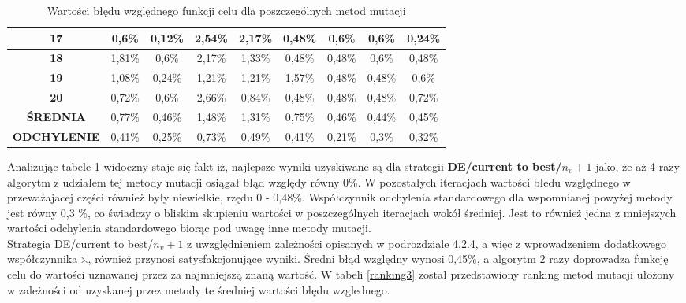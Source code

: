 \begin{table}[h!]
\begin{center}
{\begin{tabular}{|c|c|c|c|c|c|c|c|c|}
 \textbf{17}&0,6\%&0,12\%&2,54\%&2,17\%&0,48\%&0,6\%&0,6\%&0,24\%\\
\hline
 \textbf{18}&1,81\%&0,6\%&2,17\%&1,33\%&0,48\%&0,48\%&0,6\%&0,48\%\\
\hline
 \textbf{19}&1,08\%&0,24\%&1,21\%&1,21\%&1,57\%&0,48\%&0,48\%&0,6\%\\
\hline
 \textbf{20}&0,72\%&0,6\%&2,66\%&0,84\%&0,48\%&0,48\%&0,48\%&0,72\%\\
\hline
 \textbf{ŚREDNIA}&0,77\%&0,46\%&1,48\%&1,31\%&0,75\%&0,46\%&0,44\%&0,45\%\\
\hline
 \textbf{ODCHYLENIE}&0,41\%&0,25\%&0,73\%&0,49\%&0,41\%&0,21\%&0,3\%&0,32\%\\
\hline
\end{tabular}}
\caption{Wartości błędu względnego funkcji celu dla poszczególnych metod mutacji}
\label{losowa20}
\end{center}
\end{table}
\par
Analizując tabele \ref{losowa20} widoczny staje się fakt iż, najlepsze wyniki uzyskiwane są dla strategii \textbf{DE/current to best/\textbf{$n_{v}+1$}} jako, że aż 4 razy algorytm z udziałem tej metody mutacji osiągał błąd względy równy 0\%. W pozostałych iteracjach wartości błedu względnego w przeważajacej części również były niewielkie, rzędu 0 - 0,48\%.  Współczynnik  odchylenia standardowego dla wspomnianej powyżej metody jest równy 0,3 \%, co świadczy o bliskim skupieniu wartości w poszczególnych iteracjach wokół średniej. Jest to również jedna z mniejszych wartości odchylenia standardowego biorąc pod uwagę inne metody mutacji.\\
Strategia  DE/current to best/$n_{v}+1$ z uwzględnieniem zależności opisanych w podrozdziale 4.2.4, a więc z wprowadzeniem dodatkowego współczynnika $\leftthreetimes$, również przynosi satysfakcjonujące wyniki. Średni błąd względny wynosi 0,45\%, a algorytm 2 razy doprowadza funkcję celu do wartości uznawanej przez \cite{qaplib} za najmniejszą znaną wartość. W tabeli \ref{ranking3} został przedstawiony ranking metod mutacji ułożony w zależności od uzyskanej przez metody te średniej wartości błędu wzglednego.

